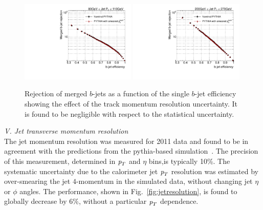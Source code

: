 \begin{figure}[tp]
\centering
\includegraphics[width=0.49\textwidth]{FIGS/systematics/LlhoodKDE_ISO_TrackMomentumResolution_FIX2Test_rejvseff080.pdf}
\includegraphics[width=0.49\textwidth]{FIGS/systematics/LlhoodKDE_ISO_TrackMomentumResolution_FIX2Test_rejvseff200.pdf}
\caption{Rejection of merged $b$-jets as a function of the single $b$-jet efficiency showing the effect of the track momentum resolution uncertainty. It is found to be negligible with respect to the statistical uncertainty. }
\label{fig:trackmomentum}
\end{figure}


\vspace{3mm}
{ \em V. Jet transverse momentum resolution}
\\[3mm]
The jet momentum resolution was measured for 2011 data and found to be in agreement with the predictions from the {\sc pythia}-based simulation~\cite{JER2011}. The precision of this measurement, determined in ${\emph{p}_{T}}$ and $\eta$ bins,is typically 10\%.
The systematic uncertainty due to the calorimeter jet ${\emph{p}_{T}}$ resolution was estimated by over-smearing the jet $4$-momentum in the simulated data, without changing jet $\eta$ or $\phi$ angles. The performance, shown in Fig.~\ref{fig:jetresolution}, is found to globally decrease by 6\%, without a particular ${\emph{p}_{T}}$ dependence.


